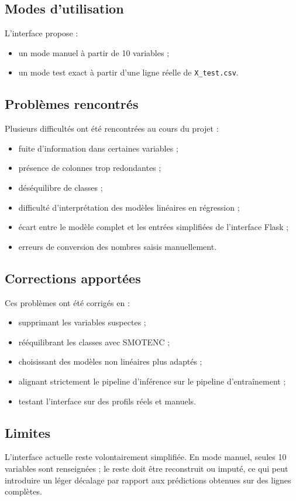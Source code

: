 \documentclass[11pt,a4paper]{article}
\begin{document}
\subsection{Modes d’utilisation}
L’interface propose :
\begin{itemize}
    \item un mode manuel à partir de 10 variables ;
    \item un mode test exact à partir d’une ligne réelle de \texttt{X\_test.csv}.
\end{itemize}

\subsection{Problèmes rencontrés}
Plusieurs difficultés ont été rencontrées au cours du projet :
\begin{itemize}
    \item fuite d’information dans certaines variables ;
    \item présence de colonnes trop redondantes ;
    \item déséquilibre de classes ;
    \item difficulté d’interprétation des modèles linéaires en régression ;
    \item écart entre le modèle complet et les entrées simplifiées de l’interface Flask ;
    \item erreurs de conversion des nombres saisis manuellement.
\end{itemize}

\subsection{Corrections apportées}
Ces problèmes ont été corrigés en :
\begin{itemize}
    \item supprimant les variables suspectes ;
    \item rééquilibrant les classes avec SMOTENC ;
    \item choisissant des modèles non linéaires plus adaptés ;
    \item alignant strictement le pipeline d’inférence sur le pipeline d’entraînement ;
    \item testant l’interface sur des profils réels et manuels.
\end{itemize}

\subsection{Limites}
L’interface actuelle reste volontairement simplifiée. En mode manuel, seules 10 variables sont renseignées ; le reste doit être reconstruit ou imputé, ce qui peut introduire un léger décalage par rapport aux prédictions obtenues sur des lignes complètes.
\end{document}
